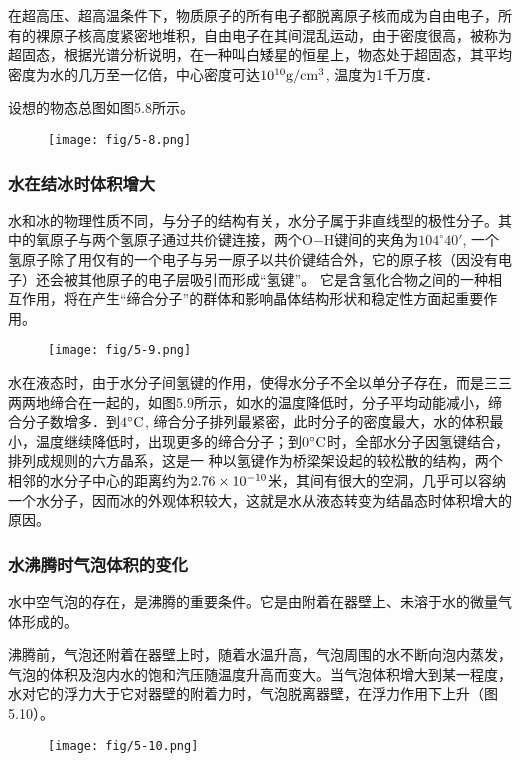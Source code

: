 在超高压、超高温条件下，物质原子的所有电子都脱离原子核而成为自由电子，所有的裸原子核高度紧密地堆积，自由电子在其间混乱运动，由于密度很高，被称为超固态，根据光谱分析说明，在一种叫白矮星的恒星上，物态处于超固态，其平均密度为水的几万至一亿倍，中心密度可达$10^{10}{\rm g/cm^3}$, 温度为1千万度．

设想的物态总图如图5.8所示。
\begin{figure}[htp]
  \centering
  \texttt{[image: fig/5-8.png]}
  \caption{}
\end{figure}

\subsubsection{水在结冰时体积增大}

水和冰的物理性质不同，与分子的结构有关，水分子属于非直线型的极性分子。其中的氧原子与两个氢原子通过共价键连接，两个O$-$H键间的夹角为$104^{\circ}40'$, 一个氢原子除了用仅有的一个电子与另一原子以共价键结合外，它的原子核（因没有电子）还会被其他原子的电子层吸引而形成“氢键”。 它是含氢化合物之间的一种相互作用，将在产生“缔合分子”的群体和影响晶体结构形状和稳定性方面起重要作用。
\begin{figure}[htp]
  \centering
  \texttt{[image: fig/5-9.png]}
  \caption{}
\end{figure}

水在液态时，由于水分子间氢键的作用，使得水分子不全以单分子存在，而是三三两两地缔合在一起的，如图5.9所示，如水的温度降低时，分子平均动能减小，缔合分子数增多．到$4^{\circ}{\rm C}$, 缔合分子排列最紧密，此时分子的密度最大，水的体积最小，温度继续降低时，出现更多的缔合分子；到$0^{\circ}{\rm C}$时，全部水分子因氢键结合，排列成规则的六方晶系，这是一
种以氢键作为桥梁架设起的较松散的结构，两个相邻的水分子中心的距离约为$2. 76\times10^{-10}$米，其间有很大的空洞，几乎可以容纳一个水分子，因而冰的外观体积较大，这就是水从液态转变为结晶态时体积增大的原因。


\subsubsection{水沸腾时气泡体积的变化}

水中空气泡的存在，是沸腾的重要条件。它是由附着在器壁上、未溶于水的微量气体形成的。

沸腾前，气泡还附着在器壁上时，随着水温升高，气泡周围的水不断向泡内蒸发，气泡的体积及泡内水的饱和汽压随温度升高而变大。当气泡体积增大到某一程度，水对它的浮力大于它对器壁的附着力时，气泡脱离器壁，在浮力作用下上升（图5.10）。
\begin{figure}[htp]
  \centering
  \texttt{[image: fig/5-10.png]}
  \caption{}
\end{figure}

